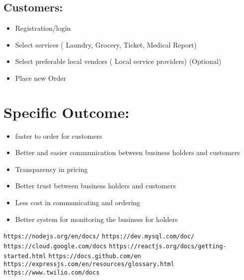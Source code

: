 \documentclass[13pt]{extarticle}
\begin{document}
\subsection{Customers:}
\begin{itemize}
    \item Registration/login 
\item Select services ( Laundry, Grocery, Ticket, Medical Report)
\item Select preferable local vendors ( Local service providers) (Optional)
\item Place new Order
\end{itemize}
\newpage
\section{\textbf{Specific Outcome:}}
\begin{itemize}
    \item faster to order for customers
    \item Better and easier communication between business holders and customers
    \item Transparency in pricing
    \item Better trust between business holders and customers
    \item Less cost in communicating and ordering
    \item Better system for monitoring the business for holders
\end{itemize}
\newpage
\begin{thebibliography}{9}
\bibitem{}
\texttt{https://nodejs.org/en/docs/}
\bibitem{}
\texttt{https://dev.mysql.com/doc/}
\bibitem{}
\texttt{https://cloud.google.com/docs}
\bibitem{}
\texttt{https://reactjs.org/docs/getting-started.html}
\bibitem{}
\texttt{https://docs.github.com/en}
\bibitem{}
\texttt{https://expressjs.com/en/resources/glossary.html}
\bibitem{}
\texttt{https://www.twilio.com/docs}
\end{thebibliography}
\end{document}

